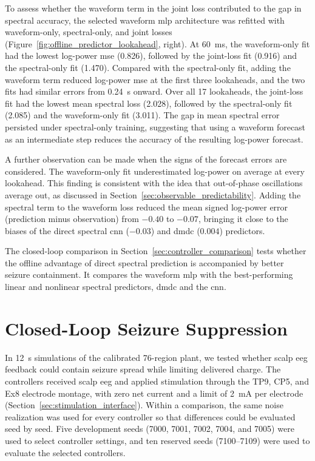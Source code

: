 To assess whether the waveform term in the joint loss contributed to the gap in spectral accuracy, the selected waveform \ac{mlp} architecture was refitted with waveform-only, spectral-only, and joint losses (Figure~\ref{fig:offline_predictor_lookahead}, right).
At \SI{60}{\milli\second}, the waveform-only fit had the lowest log-power \ac{mse} (0.826), followed by the joint-loss fit (0.916) and the spectral-only fit (1.470).
Compared with the spectral-only fit, adding the waveform term reduced log-power \ac{mse} at the first three lookaheads, and the two fits had similar errors from \SI{0.24}{\second} onward.
Over all 17 lookaheads, the joint-loss fit had the lowest mean spectral loss (2.028), followed by the spectral-only fit (2.085) and the waveform-only fit (3.011).
The gap in mean spectral error persisted under spectral-only training, suggesting that using a waveform forecast as an intermediate step reduces the accuracy of the resulting log-power forecast.

A further observation can be made when the signs of the forecast errors are considered.
The waveform-only fit underestimated log-power on average at every lookahead.
This finding is consistent with the idea that out-of-phase oscillations average out, as discussed in Section~\ref{sec:observable_predictability}.
Adding the spectral term to the waveform loss reduced the mean signed log-power error (prediction minus observation) from $-0.40$ to $-0.07$, bringing it close to the biases of the direct spectral \ac{cnn} ($-0.03$) and \ac{dmdc} ($0.004$) predictors.

The closed-loop comparison in Section~\ref{sec:controller_comparison} tests whether the offline advantage of direct spectral prediction is accompanied by better seizure containment.
It compares the waveform \ac{mlp} with the best-performing linear and nonlinear spectral predictors, \ac{dmdc} and the \ac{cnn}.

\section{Closed-Loop Seizure Suppression}

In \SI{12}{\second} simulations of the calibrated 76-region plant, we tested whether scalp \ac{eeg} feedback could contain seizure spread while limiting delivered charge.
The controllers received scalp \ac{eeg} and applied stimulation through the TP9, CP5, and Ex8 electrode montage, with zero net current and a limit of \SI{2}{\milli\ampere} per electrode (Section~\ref{sec:stimulation_interface}).
Within a comparison, the same noise realization was used for every controller so that differences could be evaluated seed by seed.
Five development seeds (7000, 7001, 7002, 7004, and 7005) were used to select controller settings, and ten reserved seeds (7100--7109) were used to evaluate the selected controllers.

